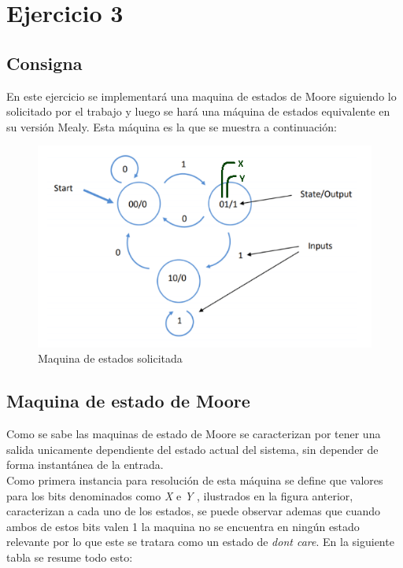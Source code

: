 \chapter{Ejercicio 3}

\section{Consigna}

En este ejercicio se implementará una maquina de estados de Moore siguiendo lo solicitado por el trabajo y luego se hará una máquina de estados equivalente en su versión Mealy. Esta máquina es la que se muestra a continuación:\\

\begin{figure}[H]
\begin{center}
\includegraphics[scale=0.8]{../Ejercicio-3/imagenes/consigna.png}
\end{center}
\caption{Maquina de estados solicitada}

\end{figure}


\section{Maquina de estado de Moore}

Como se sabe las maquinas de estado de Moore se caracterizan por tener una salida unicamente dependiente del estado actual del sistema, sin depender de forma instantánea de la entrada.\\

Como primera instancia para resolución de esta máquina se define que valores para los bits denominados como \emph{X} e \emph{Y }, ilustrados en la figura anterior, caracterizan a cada uno de los estados, se puede observar ademas que cuando ambos de estos bits valen 1 la maquina no se encuentra en ningún estado relevante por lo que este se tratara como un estado de \emph{don\textasciiacute t care}. En la siguiente tabla se resume todo esto:\\

